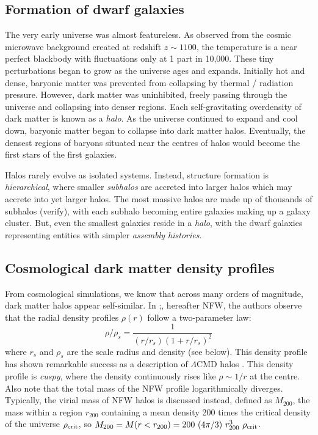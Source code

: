 \subsection{Formation of dwarf
galaxies}\label{formation-of-dwarf-galaxies}

The very early universe was almost featureless. As observed from the
cosmic microwave background created at redshift \(z\sim 1100\), the
temperature is a near perfect blackbody with fluctuations only at 1 part
in 10,000. These tiny perturbations began to grow as the universe ages
and expands. Initially hot and dense, baryonic matter was prevented from
collapsing by thermal / radiation pressure. However, dark matter was
uninhibited, freely passing through the universe and collapsing into
denser regions. Each self-gravitating overdensity of dark matter is
known as a \emph{halo}. As the universe continued to expand and cool
down, baryonic matter began to collapse into dark matter halos.
Eventually, the densest regions of baryons situated near the centres of
halos would become the first stars of the first galaxies.

Halos rarely evolve as isolated systems. Instead, structure formation is
\emph{hierarchical}, where smaller \emph{subhalos} are accreted into
larger halos which may accrete into yet larger halos. The most massive
halos are made up of thousands of subhalos (verify), with each subhalo
becoming entire galaxies making up a galaxy cluster. But, even the
smallest galaxies reside in a \emph{halo}, with the dwarf galaxies
representing entities with simpler \emph{assembly histories}.

\subsection{Cosmological dark matter density
profiles}\label{cosmological-dark-matter-density-profiles}

From cosmological simulations, we know that across many orders of
magnitude, dark matter halos appear self-similar. In
\citet{NFW1996};\citet{NFW1997}, hereafter NFW, the authors observe that
the radial density profiles \(\rho(r)\) follow a two-parameter law:
\begin{equation}{
\rho/\rho_s= \frac{1}{(r/r_s)(1+r/r_s)^2}
}\end{equation} where \(r_s\) and \(\rho_s\) are the scale radius and
density (see below). This density profile has shown remarkable success
as a description of \(\Lambda\)CMD halos \citep[REFS, but see
also][darkEXP, ect.]{navarro2010}. This density profile is \emph{cuspy},
where the density continuously rises like \(\rho \sim 1/r\) at the
centre. Also note that the total mass of the NFW profile logarithmically
diverges. Typically, the virial mass of NFW halos is discussed instead,
defined as \(M_{200}\), the mass within a region \(r_{200}\) containing
a mean density 200 times the critical density of the universe
\(\rho_{\rm crit}\), so
\(M_{200} = M(r<r_{200}) = 200\ (4\pi/3) \ r_{200}^3\ \rho_{\rm crit}\).

